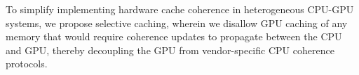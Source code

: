 %
To simplify implementing hardware cache
coherence in heterogeneous CPU-GPU systems,
we propose selective caching, wherein we disallow GPU caching of any memory that
would require coherence updates to propagate between the CPU and GPU, thereby
decoupling the GPU from vendor-specific CPU coherence protocols.

